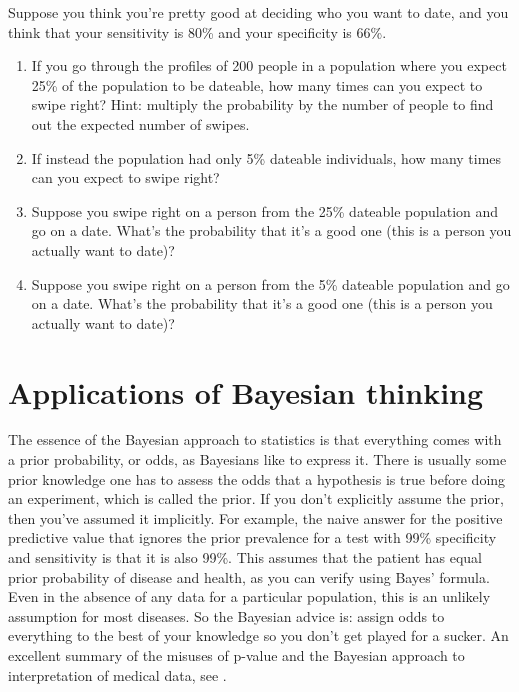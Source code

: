 \documentclass[
  letterpaper,
  DIV=11,
  numbers=noendperiod]{scrreprt}
\begin{document}
Suppose you think you're pretty good at deciding who you want to date,
and you think that your sensitivity is 80\% and your specificity is
66\%.

\begin{enumerate}
\def\labelenumi{\arabic{enumi}.}
\setcounter{enumi}{3}
\item
  If you go through the profiles of 200 people in a population where you
  expect 25\% of the population to be dateable, how many times can you
  expect to swipe right? Hint: multiply the probability by the number of
  people to find out the expected number of swipes.
\item
  If instead the population had only 5\% dateable individuals, how many
  times can you expect to swipe right?
\item
  Suppose you swipe right on a person from the 25\% dateable population
  and go on a date. What's the probability that it's a good one (this is
  a person you actually want to date)?
\item
  Suppose you swipe right on a person from the 5\% dateable population
  and go on a date. What's the probability that it's a good one (this is
  a person you actually want to date)?
\end{enumerate}

\hypertarget{applications-of-bayesian-thinking}{%
\section{Applications of Bayesian
thinking}\label{applications-of-bayesian-thinking}}

\label{sec:bio7}

The essence of the Bayesian approach to statistics is that everything
comes with a prior probability, or odds, as Bayesians like to express
it. There is usually some prior knowledge one has to assess the odds
that a hypothesis is true before doing an experiment, which is called
the prior. If you don't explicitly assume the prior, then you've assumed
it implicitly. For example, the naive answer for the positive predictive
value that ignores the prior prevalence for a test with 99\% specificity
and sensitivity is that it is also 99\%. This assumes that the patient
has equal prior probability of disease and health, as you can verify
using Bayes' formula. Even in the absence of any data for a particular
population, this is an unlikely assumption for most diseases. So the
Bayesian advice is: assign odds to everything to the best of your
knowledge so you don't get played for a sucker. An excellent summary of
the misuses of p-value and the Bayesian approach to interpretation of
medical data, see \cite{goodman_toward_1999}.
\end{document}
